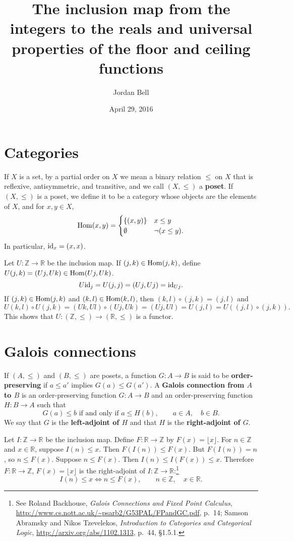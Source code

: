 \documentclass{article}
\newcommand{\id}{\ensuremath\mathrm{id}}
\newcommand{\Hom}{\ensuremath\mathrm{Hom}}
\theoremstyle{definition}
\begin{document}
\title{The inclusion map from the integers to the reals
and universal properties of the floor and ceiling functions}
\author{Jordan Bell}
\date{April 29, 2016}

\maketitle


\section{Categories}
If $X$ is a set, by a partial order on $X$ we mean a binary relation $\leq$ on $X$ that is reflexive, antisymmetric, and transitive, and we call
$(X,\leq)$ a \textbf{poset}. 
If $(X,\leq)$ is a poset, we define it to be a category whose objects are the elements of $X$, and
for $x,y \in X$, 
\[
\Hom(x,y) = \begin{cases}
\{(x,y)\}&x \leq y\\
\emptyset&\neg (x \leq y).
\end{cases}
\]
In particular, $\id_x = (x,x)$. 

Let $U:\mathbb{Z} \to \mathbb{R}$ be the inclusion map. 
If $(j,k) \in \Hom(j,k)$, define
$U(j,k) = (Uj,Uk) \in \Hom(Uj,Uk)$. 
\[
U\id_j = U(j,j) = (Uj,Uj) = \id_{Uj}.
\]
If $(j,k) \in \Hom(j,k)$ and $(k,l) \in \Hom(k,l)$, then 
$(k,l) \circ (j,k) = (j,l)$ and 
\[
U(k,l) \circ U(j,k)  =(Uk,Ul) \circ (Uj,Uk)   =  (Uj,Ul) = U(j,l)
=U((j,l) \circ (j,k)).
\] 
This shows that $U:(\mathbb{Z},\leq) \to (\mathbb{R},\leq)$ is a functor.




\section{Galois connections}
If $(A,\leq)$ and $(B,\leq)$ are posets, 
a function $G:A \to B$ is said to be \textbf{order-preserving} if 
$a \leq a'$ implies $G(a) \leq G(a')$. 
A \textbf{Galois connection from $A$ to $B$}
is an order-preserving function $G:A \to B$ and an order-preserving function $H:B \to A$
such that
\[
\textrm{$G(a) \leq b$ if and only if $a \leq H(b)$},\qquad a \in A,\quad b \in B.
\]
We say that $G$ is the \textbf{left-adjoint of $H$} and that
$H$ is the \textbf{right-adjoint of $G$}.


Let $I:\mathbb{Z} \to \mathbb{R}$ be the inclusion map. 
Define $F:\mathbb{R} \to \mathbb{Z}$ by $F(x)=\lfloor x \rfloor$.
For $n \in \mathbb{Z}$ and $x \in \mathbb{R}$,
suppose $I(n) \leq x$. Then $F(I(n)) \leq F(x)$. But $F(I(n)) = n$, so
$n \leq F(x)$. Suppose $n \leq F(x)$. Then $I(n) \leq I(F(x)) \leq x$. 
Therefore $F:\mathbb{R} \to \mathbb{Z}$, $F(x) =\lfloor x \rfloor$ is the right-adjoint of $I:\mathbb{Z} \to \mathbb{R}$:\footnote{See
Roland Backhouse, {\em Galois Connections and Fixed Point Calculus},
\url{http://www.cs.nott.ac.uk/~psarb2/G53PAL/FPandGC.pdf}, p.~14;
Samson Abramsky and Nikos Tzevelekos, {\em Introduction to Categories and Categorical Logic},
\url{http://arxiv.org/abs/1102.1313},
p.~44, \S 1.5.1.}
\[
I(n) \leq x \iff n \leq F(x),\qquad  n \in \mathbb{Z},\quad x \in \mathbb{R}.
\]
\end{document}
